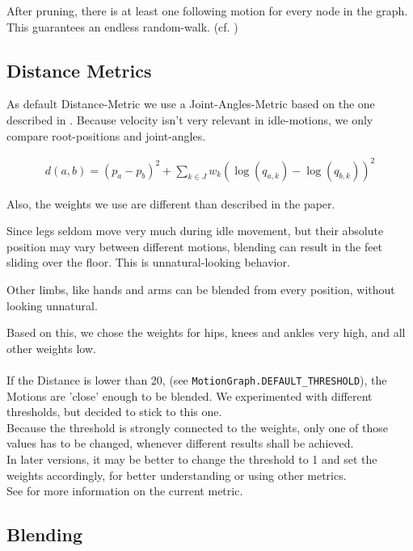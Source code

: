 \documentclass[a4paper,10pt,titlepage,bibliography=totocnumbered]{scrartcl}
\begin{document}
After pruning, there is at least one following motion for every node in the graph. This guarantees an endless random-walk. (cf. )



\subsection{Distance Metrics}
\label{sec:distanceMetric}

As default Distance-Metric we use a Joint-Angles-Metric based on the one described in \cite[4.1 Joint angles]{vanbasten2009}.
Because velocity isn't very relevant in idle-motions, we only compare root-positions and joint-angles.

\begin{align}
d(a,b) = (p_a-p_b)^2 + \sum_{k \in J} w_{k} (\log(q_{a,k}) - \log(q_{b,k}))^2
\end{align}

Also, the weights we use are different than described in the paper. 

Since legs seldom move very much during idle movement, but their absolute position may vary between different motions, blending can result in the feet sliding over the floor. This is unnatural-looking behavior. 

Other limbs, like hands and arms can be blended from every position, without looking unnatural.

Based on this, we chose the weights for hips, knees and ankles very high, and all other weights low.
\\\\
If the Distance is lower than 20, (see \lstinline{MotionGraph.DEFAULT_THRESHOLD}), the Motions are 'close' enough to be blended. We experimented with different thresholds, but decided to stick to this one. 
\\
Because the threshold is strongly connected to the weights, only one of those values has to be changed, whenever different results shall be achieved. \\
In later versions, it may be better to change the threshold to 1 and set the weights accordingly, for better understanding or using other metrics.
\\
See   for more information on the current metric.


\subsection{Blending}
\label{sec:blending}
\end{document}
